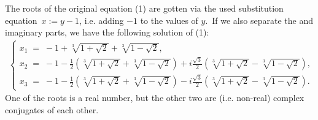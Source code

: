 \documentclass[12pt]{article}
\theoremstyle{definition}
\begin{document}
The roots of the original equation (1) are gotten via the used substitution equation\, $x := y-1$, i.e. adding $-1$ to the values of $y$.\, If we also separate the  and imaginary parts, we have the following solution of (1):
\begin{align*}
\begin{cases}
x_1 \;=\; -1\!+\!\sqrt[3]{1\!+\!\sqrt{2}}\!+\!\sqrt[3]{1\!-\!\sqrt{2}},\\ 
x_2 \;=\; -1\!-\!\frac{1}{2}\!\left(\sqrt[3]{1\!+\!\sqrt{2}}\!+\!\sqrt[3]{1\!-\!\sqrt{2}}\right)\!
+i\frac{\sqrt{3}}{2}\!\left(\sqrt[3]{1\!+\!\sqrt{2}}\!-\!\sqrt[3]{1\!-\!\sqrt{2}}\right),\\
x_3 \;=\; -1\!-\!\frac{1}{2}\!\left(\sqrt[3]{1\!+\!\sqrt{2}}\!+\!\sqrt[3]{1\!-\!\sqrt{2}}\right)\!
-i\frac{\sqrt{3}}{2}\!\left(\sqrt[3]{1\!+\!\sqrt{2}}\!-\!\sqrt[3]{1\!-\!\sqrt{2}}\right).
\end{cases}
\end{align*}
One of the roots is a real number, but the other two are  (i.e. non-real) complex conjugates of each other.
\end{document}
